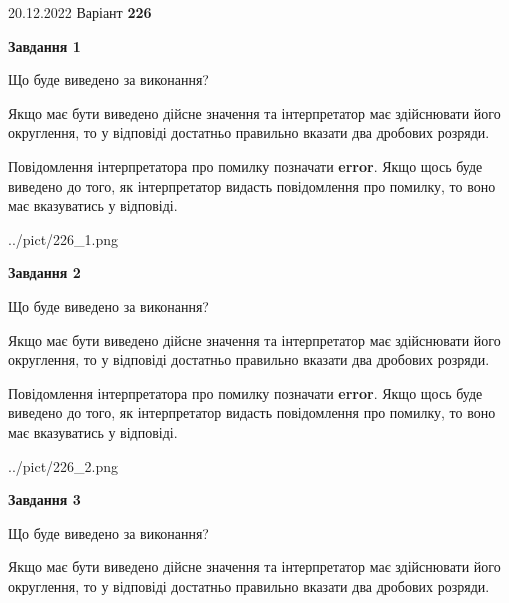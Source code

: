 \documentclass[12pt, ukrainian]{article}
\begin{document}
{20.12.2022 Варіант \No \textbf { 226 }\par}
{
\begin {Large}

{\begin {center}\textbf{Завдання 1}\end {center}}\par
Що буде виведено за виконання? \par

Якщо має бути виведено дійсне значення та інтерпретатор має здійснювати його округлення, 
то у відповіді достатньо правильно вказати два дробових розряди.

Повідомлення інтерпретатора про помилку позначати \textbf{error}.
Якщо щось буде виведено до того, як інтерпретатор видасть повідомлення про помилку, 
то воно має вказуватись у відповіді. \par

\begin{center}
	{../pict/226_1.png}
\end{center}
\newpage

{\begin {center}\textbf{Завдання 2}\end {center}}\par
Що буде виведено за виконання? \par

Якщо має бути виведено дійсне значення та інтерпретатор має здійснювати його округлення, 
то у відповіді достатньо правильно вказати два дробових розряди.

Повідомлення інтерпретатора про помилку позначати \textbf{error}.
Якщо щось буде виведено до того, як інтерпретатор видасть повідомлення про помилку, 
то воно має вказуватись у відповіді. \par

\begin{center}
	{../pict/226_2.png}
\end{center}
\newpage

{\begin {center}\textbf{Завдання 3}\end {center}}\par
Що буде виведено за виконання? \par

Якщо має бути виведено дійсне значення та інтерпретатор має здійснювати його округлення, 
то у відповіді достатньо правильно вказати два дробових розряди.


\end{Large}}
\end{document}
